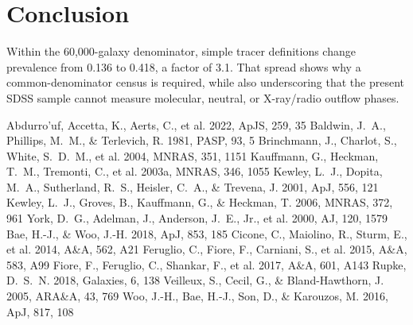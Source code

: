 \documentclass[twocolumn]{aastex631}
\begin{document}
\section{Conclusion}\label{sec:conclusion}
Within the 60,000-galaxy denominator, simple tracer definitions change prevalence from 0.136 to 0.418, a factor of 3.1. That spread shows why a common-denominator census is required, while also underscoring that the present SDSS sample cannot measure molecular, neutral, or X-ray/radio outflow phases.


\begin{thebibliography}{}
 Abdurro'uf, Accetta, K., Aerts, C., et al. 2022, ApJS, 259, 35
 Baldwin, J.~A., Phillips, M.~M., \& Terlevich, R. 1981, PASP, 93, 5
 Brinchmann, J., Charlot, S., White, S.~D.~M., et al. 2004, MNRAS, 351, 1151
 Kauffmann, G., Heckman, T.~M., Tremonti, C., et al. 2003a, MNRAS, 346, 1055
 Kewley, L.~J., Dopita, M.~A., Sutherland, R.~S., Heisler, C.~A., \& Trevena, J. 2001, ApJ, 556, 121
 Kewley, L.~J., Groves, B., Kauffmann, G., \& Heckman, T. 2006, MNRAS, 372, 961
 York, D.~G., Adelman, J., Anderson, J.~E., Jr., et al. 2000, AJ, 120, 1579
 Bae, H.-J., \& Woo, J.-H. 2018, ApJ, 853, 185
 Cicone, C., Maiolino, R., Sturm, E., et al. 2014, A\&A, 562, A21
 Feruglio, C., Fiore, F., Carniani, S., et al. 2015, A\&A, 583, A99
 Fiore, F., Feruglio, C., Shankar, F., et al. 2017, A\&A, 601, A143
 Rupke, D.~S.~N. 2018, Galaxies, 6, 138
 Veilleux, S., Cecil, G., \& Bland-Hawthorn, J. 2005, ARA\&A, 43, 769
 Woo, J.-H., Bae, H.-J., Son, D., \& Karouzos, M. 2016, ApJ, 817, 108
\end{thebibliography}
\end{document}
